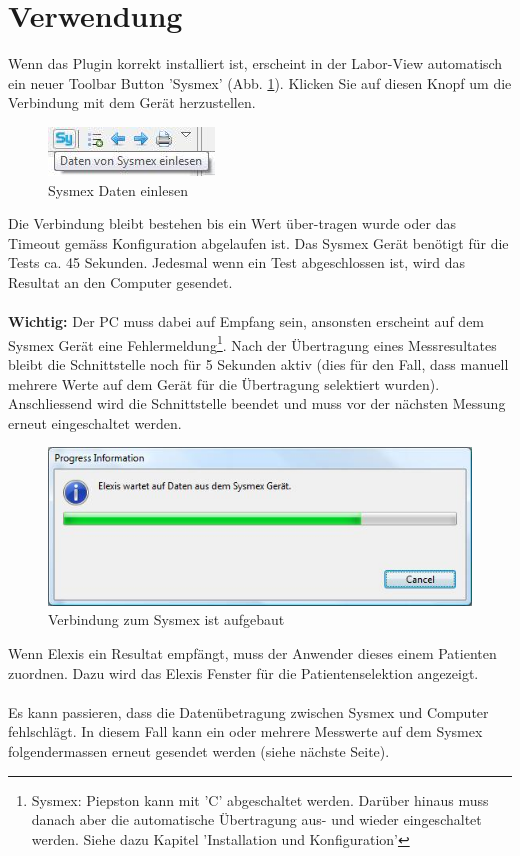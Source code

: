 \documentclass[a4paper]{scrartcl}
\begin{document}
\section{Verwendung}
Wenn das Plugin korrekt installiert ist, erscheint in der Labor-View automatisch ein neuer Toolbar Button 'Sysmex' (Abb. \ref{fig:toolbarbutton}). Klicken Sie auf diesen Knopf um die Verbindung mit dem Ger\"at herzustellen. 
\begin{figure}[h]
    \centering
    \includegraphics{toolbarbutton}
    \caption{Sysmex Daten einlesen}
    \label{fig:toolbarbutton}
\end{figure}
Die Verbindung bleibt bestehen bis ein Wert \"uber-tragen wurde oder das Timeout gem\"ass Konfiguration abgelaufen ist. Das Sysmex Ger\"at ben\"otigt f\"ur die Tests ca. 45 Sekunden. Jedesmal wenn ein Test abgeschlossen ist, wird das Resultat an den Computer gesendet.\\
\\
\textbf{Wichtig:} Der PC muss dabei auf Empfang sein, ansonsten erscheint auf dem Sysmex Ger\"at eine Fehlermeldung\footnote{Sysmex: Piepston kann mit 'C' abgeschaltet werden. Dar\"uber hinaus muss danach aber die automatische \"Ubertragung aus- und wieder eingeschaltet werden. Siehe dazu Kapitel 'Installation und Konfiguration'}.
Nach der \"Ubertragung eines Messresultates bleibt die Schnittstelle noch f\"ur 5 Sekunden aktiv (dies f\"ur den Fall, dass manuell mehrere Werte auf dem Ger\"at f\"ur die \"Ubertragung selektiert wurden). Anschliessend wird die Schnittstelle beendet und muss vor der n\"achsten Messung erneut eingeschaltet werden.
\begin{figure}[h]
    \centering
    \includegraphics{connected}
    \caption{Verbindung zum Sysmex ist aufgebaut}
    \label{fig:connected}
\end{figure}
Wenn Elexis ein Resultat empf\"angt, muss der Anwender dieses einem Patienten zuordnen. Dazu wird das Elexis Fenster f\"ur die Patientenselektion angezeigt.\\
\\
Es kann passieren, dass die Daten\"ubetragung zwischen Sysmex und Computer fehlschl\"agt. In diesem Fall kann ein oder mehrere Messwerte auf dem Sysmex folgendermassen erneut gesendet werden (siehe n\"achste Seite).\\
\end{document}
